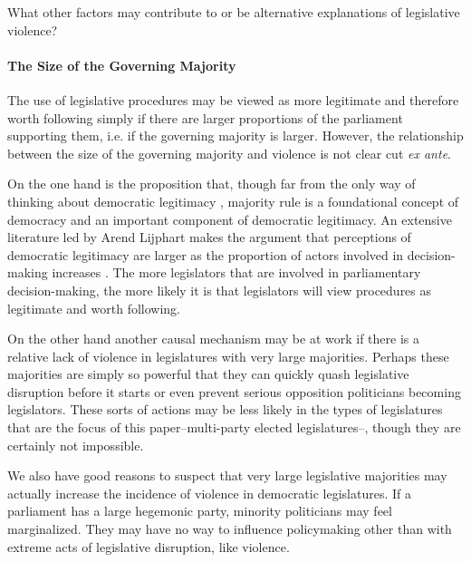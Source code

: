 \documentclass[a4paper]{article}\usepackage[]{graphicx}\usepackage[]{color}
\begin{document}
What other factors may contribute to or be alternative explanations of legislative violence?

\paragraph{The Size of the Governing Majority}

The use of legislative procedures may be viewed as more legitimate and therefore worth following simply if there are larger proportions of the parliament supporting them, i.e. if the governing majority is larger. However, the relationship between the size of the governing majority and violence is not clear cut \emph{ex ante}.

On the one hand is the proposition that, though far from the only way of thinking about democratic legitimacy \cite[see][for a discussion]{Follesdal2006}, majority rule is a foundational concept of democracy \citep{Dahl1989} and an important component of democratic legitimacy. An extensive literature led by Arend Lijphart makes the argument that perceptions of democratic legitimacy are larger as the proportion of actors involved in decision-making increases \citep[see][]{Lijphart2007}. The more legislators that are involved in parliamentary decision-making, the more likely it is that legislators will view procedures as legitimate and worth following.

On the other hand another causal mechanism may be at work if there is a relative lack of violence in legislatures with very large majorities. Perhaps these majorities are simply so powerful that they can quickly quash legislative disruption before it starts or even prevent serious opposition politicians becoming legislators. These sorts of actions may be less likely in the types of legislatures that are the focus of this paper--multi-party elected legislatures--, though they are certainly not impossible.

We also have good reasons to suspect that very large legislative majorities may actually increase the incidence of violence in democratic legislatures. If a parliament has a large hegemonic party, minority politicians may feel marginalized. They may have no way to influence policymaking other than with extreme acts of legislative disruption, like violence.
\end{document}
